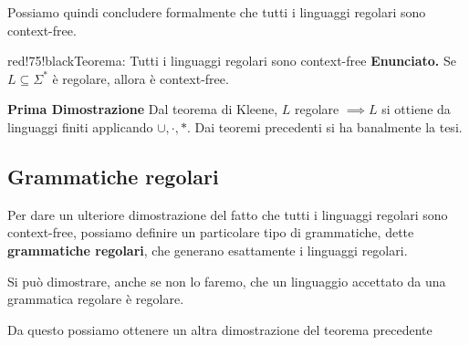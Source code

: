 Possiamo quindi concludere formalmente che tutti i linguaggi regolari sono context-free.

\begin{halfframedbox}{red!75!black}{Teorema: Tutti i linguaggi regolari sono context-free}\label{Teorema Linguaggi regolari sono context-free}
  \textbf{Enunciato.} Se $L \subseteq \Sigma^*$ è regolare, allora è context-free.

  \begin{center}
    \textcolor{red!75!black}{\hdashrule[0.5ex]{18cm}{1pt}{3mm 3pt 1mm 2pt}}
  \end{center}

  \textbf{Prima Dimostrazione}
    Dal teorema di Kleene, $L$ regolare $\implies L$ si ottiene da linguaggi finiti applicando $\cup, \cdot, *$. Dai teoremi precedenti si ha banalmente la tesi.
\end{halfframedbox}

\subsection{Grammatiche regolari}

Per dare un ulteriore dimostrazione del fatto che tutti i linguaggi regolari sono context-free, possiamo definire un particolare tipo di grammatiche, dette \textbf{grammatiche regolari}, che generano esattamente i linguaggi regolari.


Si può dimostrare, anche se non lo faremo, che un linguaggio accettato da una grammatica regolare è regolare.

Da questo possiamo ottenere un altra dimostrazione del teorema precedente

